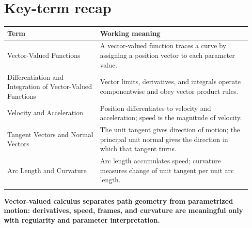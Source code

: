 \documentclass[11pt]{article}
\begin{document}
\normalsize

\section{Key-term recap}
\small
\begin{longtable}{@{}>{\RaggedRight\arraybackslash}p{}>{\RaggedRight\arraybackslash}p{}@{}}
\toprule
\textbf{Term} & \textbf{Working meaning}\\
\midrule\endhead
Vector-Valued Functions & A vector-valued function traces a curve by assigning a position vector to each parameter value. \\\addlinespace[2pt]
Differentiation and Integration of Vector-Valued Functions & Vector limits, derivatives, and integrals operate componentwise and obey vector product rules. \\\addlinespace[2pt]
Velocity and Acceleration & Position differentiates to velocity and acceleration; speed is the magnitude of velocity. \\\addlinespace[2pt]
Tangent Vectors and Normal Vectors & The unit tangent gives direction of motion; the principal unit normal gives the direction in which that tangent turns. \\\addlinespace[2pt]
Arc Length and Curvature & Arc length accumulates speed; curvature measures change of unit tangent per unit arc length. \\\addlinespace[2pt]
\bottomrule
\end{longtable}
\normalsize

\enlargethispage{4\baselineskip}
\begin{tcolorbox}[title=One-sentence takeaway,fonttitle=\bfseries,colback=Ink,colframe=Ink,coltext=white,coltitle=white,arc=2mm,boxrule=0pt]
\centering\bfseries Vector-valued calculus separates path geometry from parametrized motion: derivatives, speed, frames, and curvature are meaningful only with regularity and parameter interpretation.
\end{tcolorbox}
\end{document}
